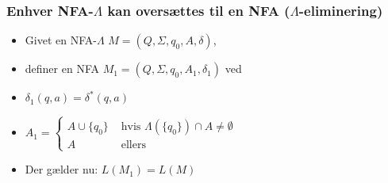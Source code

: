 \begin{frame}
\frametitle{Enhver NFA-$\Lambda $ kan oversættes til en NFA
($\Lambda $-eliminering)}
\begin{itemize}[<+->]
\item Givet en NFA-$\Lambda $ $M=(Q, \Sigma , q_0, A, \delta )$, 
\item definer en NFA $M_1=(Q, \Sigma , q_0, A_1, \delta _1)$ ved
\item $\delta _1(q, a) =  \delta ^*(q, a)$
\item $A_1 =
  \begin{cases}
    A \cup \{ q_0\} & \text{ hvis } \Lambda(\{q_0\})\cap A \neq \emptyset \\
    A & \text{ ellers }
  \end{cases}
$
\item Der gælder nu: $L(M_1) = L(M)$
\end{itemize}
\end{frame}

